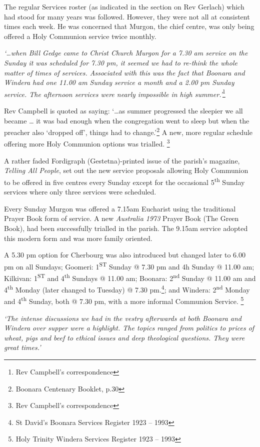 The regular Services roster (as indicated in the section on Rev Gerlach) which had stood for many years was followed. However, they were not all at consistent times each week. He was concerned that Murgon, the chief centre, was only being offered a Holy Communion service twice monthly.

\emph{`\ldots when Bill Gedge came to Christ Church Murgon for a 7.30 am service on the Sunday it was scheduled for 7.30 pm, it seemed we had to re-think the whole matter of times of services. Associated with this was the fact that Boonara and Windera had one 11.00 am Sunday service a month and a 2.00 pm Sunday service. The afternoon services were nearly impossible in high summer.'}\footnote{Rev Campbell's correspondence}

Rev Campbell is quoted as saying: `\ldots as summer progressed the sleepier we all became \ldots{} it was bad enough when the congregation went to sleep but when the preacher also `dropped off', things had to change.'\footnote{Boonara Centenary Booklet, p.30} A new, more regular schedule offering more Holy Communion options was trialled. \footnote{Rev Campbell's correspondence}

A rather faded Fordigraph (Gestetna)-printed issue of the parish's magazine, \emph{Telling All People}, set out the new service proposals allowing Holy Communion to be offered in five centres every Sunday except for the occasional 5\textsuperscript{th} Sunday services where only three services were scheduled.

Every Sunday Murgon was offered a 7.15am Eucharist using the traditional Prayer Book form of service. A new \emph{Australia 1973} Prayer Book (The Green Book), had been successfully trialled in the parish. The 9.15am service adopted this modern form and was more family oriented.

A 5.30 pm option for Cherbourg was also introduced but changed later to 6.00 pm on all Sundays; Goomeri: 1\textsuperscript{ST} Sunday @ 7.30 pm and 4h Sunday @ 11.00 am; Kilkivan: 1\textsuperscript{ST} and 4\textsuperscript{th} Sundays @ 11.00 am; Boonara: 2\textsuperscript{nd} Sunday @ 11.00 am and 4\textsuperscript{th} Monday (later changed to Tuesday) @ 7.30 pm.\footnote{St David's Boonara Services Register 1923 -- 1993}; and Windera: 2\textsuperscript{nd} Monday and 4\textsuperscript{th} Sunday, both @ 7.30 pm, with a more informal Communion Service. \footnote{Holy Trinity Windera Services Register 1923 -- 1993}

\emph{`The intense discussions we had in the vestry afterwards at both Boonara and Windera over supper were a highlight. The topics ranged from politics to prices of wheat, pigs and beef to ethical issues and deep theological questions. They were great times.'}

